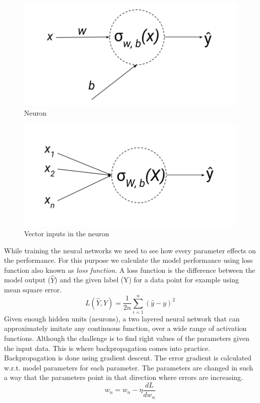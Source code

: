 \begin{figure}[!htb]
    \centering
    \includegraphics[scale=0.6]{Figures/neuron.png}
    \caption{Neuron}
    \label{fig:neuron}
\end{figure}
\begin{figure}[!htb]
    \centering
    \includegraphics[scale=0.6]{Figures/Vector-Inputs-to-Neuron.png}
    \caption{Vector inputs in the neuron}
    \label{fig:vectorinputs}
\end{figure}

While training the neural networks we need to see how every parameter effects on the performance. For this purpose we calculate the model performance using loss function also known as \emph{loss function}. A loss function is the difference between the model output ($\hat{Y}$) and the given label (Y) for a data point for example using mean square error. 
\begin{equation}
    L(\hat{Y},Y) = \frac{1}{2n}\sum_{i=1}^{n}(\hat{y}-y)^2
\end{equation}
Given enough hidden units (neurons), a two layered neural network that can approximately imitate any continuous function, over a wide range of activation functions. Although the challenge is to find right values of the parameters given the input data. This is where backpropagation comes into practice. 
Backpropagation is done using gradient descent. The error gradient is calculated w.r.t. model parameters for each parameter. The parameters are changed in such a way that the parameters point in that direction where errors are increasing. 
\begin{equation}
    w_{n} = w_{n} - \eta\frac{dL}{dw_{n}}
\end{equation}

